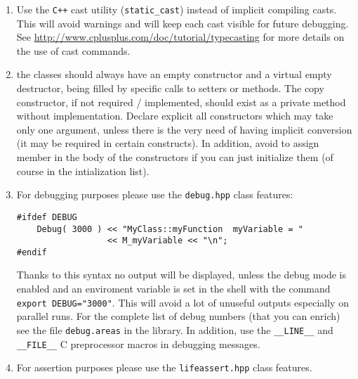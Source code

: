 \documentclass[10p]{article}
\begin{document}
\begin{enumerate}
  \item Use the \texttt{C++} cast utility (\texttt{static\_cast}) instead of implicit compiling casts. This will avoid warnings and will keep each cast visible for future debugging. See
  \url{http://www.cplusplus.com/doc/tutorial/typecasting} for more details on the use of cast commands.
  \item the classes should always have an empty constructor and a virtual empty destructor, being filled by specific calls to setters or methods. The copy constructor, if not required / implemented, should exist as a private method without implementation. Declare explicit all constructors which may take only one argument, unless there is the very need of having implicit conversion (it may be required in certain constructs). In addition, avoid to assign member in the body of the constructors if you can just initialize them (of course in the intialization list).
  \item For debugging purposes please use the \texttt{debug.hpp} class features:
\begin{lstlisting}
#ifdef DEBUG
    Debug( 3000 ) << "MyClass::myFunction  myVariable = "
                  << M_myVariable << "\n";
#endif
\end{lstlisting}
  Thanks to this syntax no output will be displayed, unless the debug mode is enabled and an enviroment variable is set in the shell with the command \texttt{export DEBUG="3000"}. This will avoid a lot of unuseful outputs especially on parallel runs. For the complete list of debug numbers (that you can enrich) see the file \texttt{debug.areas} in the library. In addition, use the \texttt{\_\_LINE\_\_} and \texttt{\_\_FILE\_\_} C preprocessor macros in debugging messages.
  \item For assertion purposes please use the \texttt{lifeassert.hpp} class features.
\end{enumerate}
\end{document}
